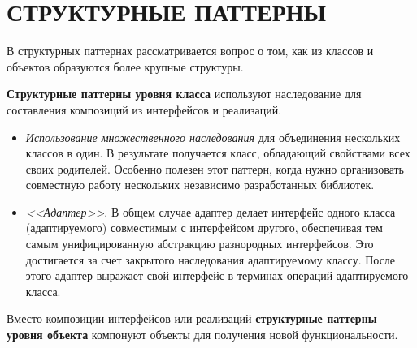 \section{СТРУКТУРНЫЕ ПАТТЕРНЫ}

В структурных паттернах рассматривается вопрос о том, как из классов и объектов
образуются более крупные структуры.

\textbf{Структурные паттерны уровня класса} используют наследование для составления
композиций из интерфейсов и реализаций.

\begin{itemize}
\item
\textit{Использование множественного наследования} для объединения нескольких классов в один.
В результате получается класс, обладающий свойствами всех своих родителей.
Особенно полезен этот паттерн, когда нужно организовать совместную работу
нескольких независимо разработанных библиотек.

\item
\textit{<<Адаптер>>}. В общем случае адаптер делает интерфейс одного класса (адаптируемого) 
совместимым с интерфейсом другого, обеспечивая тем самым унифицированную абстракцию
разнородных интерфейсов. Это достигается за счет закрытого наследования адаптируемому
классу. После этого адаптер выражает свой интерфейс в терминах операций адаптируемого класса.
\end{itemize}

Вместо композиции интерфейсов или реализаций \textbf{структурные паттерны уровня объекта}
компонуют объекты для получения новой функциональности.

